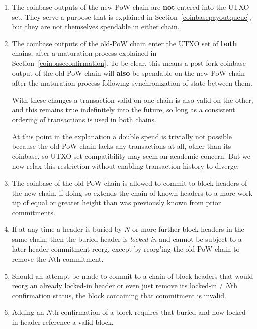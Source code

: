 \begin{enumerate}
  \item
    The coinbase outputs of the new-PoW chain are \textbf{not} entered
    into the UTXO set.  They serve a purpose that is explained in
    Section~\ref{coinbasepayoutqueue}, but they are not themselves
    spendable in either chain.

  \item The coinbase outputs of the old-PoW chain enter the UTXO set
    of \textbf{both} chains, after a maturation process explained in
    Section~\ref{coinbaseconfirmation}.  To be clear, this means a
    post-fork coinbase output of the old-PoW chain will \textbf{also}
    be spendable on the new-PoW chain after the maturation process
    following synchronization of state between them.

With these changes a transaction valid on one chain is also valid on
the other, and this remains true indefinitely into the future, so long
as a consistent ordering of transactions is used in both chains.

At this point in the explanation a double spend is trivially not
possible because the old-PoW chain lacks any transactions at all,
other than its coinbase, so UTXO set compatibility may seem an
academic concern.  But we now relax this restriction without enabling
transaction history to diverge:

  \item
    The coinbase of the old-PoW chain is allowed to commit to block
    headers of the new chain, if doing so extends the chain of known
    headers to a more-work tip of equal or greater height than was
    previously known from prior commitments.

  \item
    If at any time a header is buried by $N$ or more further block
    headers in the same chain, then the buried header
    is \emph{locked-in} and cannot be subject to a later header
    commitment reorg, except by reorg'ing the old-PoW chain to remove
    the $N$th commitment.

  \item
    Should an attempt be made to commit to a chain of block headers
    that would reorg an already locked-in header or even just remove
    its locked-in / $N$th confirmation status, the block containing
    that commitment is invalid.

  \item
    Adding an $N$th confirmation of a block requires that buried and
    now locked-in header reference a valid block.


\end{enumerate}
